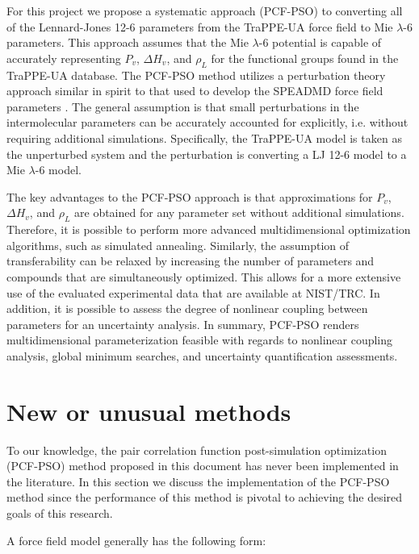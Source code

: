 \documentclass[12pt]{article}
\begin{document}
For this project we propose a systematic approach (PCF-PSO) to converting all of the Lennard-Jones 12-6 parameters from the TraPPE-UA force field to Mie $\lambda$-6 parameters. This approach assumes that the Mie $\lambda$-6 potential is capable of accurately representing $P_v$, $\Delta H_v$, and $\rho_L$ for the functional groups found in the TraPPE-UA database. The PCF-PSO method utilizes a perturbation theory approach similar in spirit to that used to develop the SPEADMD force field parameters \cite{SPEADMD}. The general assumption is that small perturbations in the intermolecular parameters can be accurately accounted for explicitly, i.e. without requiring additional simulations. Specifically, the TraPPE-UA model is taken as the unperturbed system and the perturbation is converting a LJ 12-6 model to a Mie $\lambda$-6 model.  

The key advantages to the PCF-PSO approach is that approximations for $P_v$, $\Delta H_v$, and $\rho_L$ are obtained for any parameter set without additional simulations. Therefore, it is possible to perform more advanced multidimensional optimization algorithms, such as simulated annealing. Similarly, the assumption of transferability can be relaxed by increasing the number of parameters and compounds that are simultaneously optimized. This allows for a more extensive use of the evaluated experimental data that are available at NIST/TRC. In addition, it is possible to assess the degree of nonlinear coupling between parameters for an uncertainty analysis. In summary, PCF-PSO renders multidimensional parameterization feasible with regards to nonlinear coupling analysis, global minimum searches, and uncertainty quantification assessments.  

\section{New or unusual methods}

To our knowledge, the pair correlation function post-simulation optimization (PCF-PSO) method proposed in this document has never been implemented in the literature. In this section we discuss the implementation of the PCF-PSO method since the performance of this method is pivotal to achieving the desired goals of this research. 

A force field model generally has the following form:
\end{document}
